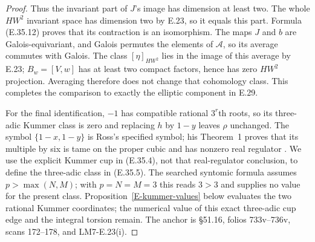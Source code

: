 \documentclass[11pt,oneside]{article}
\begin{document}
\begin{proof}
Thus the invariant part of $J$'s image has
dimension at least two. The whole $HW^2$
invariant space has dimension two by E.23,
so it equals this part. Formula (E.35.12)
proves that its contraction is an isomorphism.
The maps $J$ and $b$ are Galois-equivariant,
and Galois permutes the elements of
$\mathcal A$, so its average commutes with
Galois. The class $[\eta]_{HW^2}$ lies in the
image of this average by E.23; $B_w=[V,w]$
has at least two compact factors, hence has
zero $HW^2$ projection. Averaging therefore
does not change that cohomology class. This
completes the comparison to exactly the
elliptic component in E.29.

For the final identification, $-1$ has
compatible rational $3^r$th roots, so its
three-adic Kummer class is zero and replacing
$h$ by $1-y$ leaves $\rho$ unchanged.
The symbol $\{1-x,1-y\}$ is Ross's specified
symbol; his Theorem~1 proves that its multiple
by six is tame on the proper cubic and has
nonzero real regulator \cite{Ross1994}.
We use the explicit Kummer cup in (E.35.4),
not that real-regulator conclusion, to define
the three-adic class in (E.35.5).
The searched syntomic formula
\cite[Theorem 4.11]{Asakura2023} assumes
$p>\max(N,M)$; with $p=N=M=3$ this reads
$3>3$ and supplies no value for the present
class. Proposition~\ref{E-kummer-values} below
evaluates the two rational Kummer coordinates;
the numerical value of this exact three-adic
cup edge and the integral torsion remain.
The anchor is \S51.16,
folios 733v--736v, scans 172--178, and
LM7-E.23(i).
\end{proof}
\end{document}
